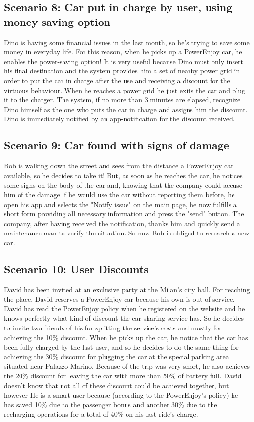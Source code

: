 \documentclass[10pt, a4paper,titlepage]{article}
\begin{document}
\subsection{Scenario 8: Car put in charge by user, using money saving option}
Dino is having some financial issues in the last month, so he's trying to save some money in everyday life.
For this reason, when he picks up a PowerEnjoy car, he enables the power-saving option! It is very useful because Dino must only insert his final destination and the system provides him a set of nearby power grid in order to put the car in charge after the use and receiving a discount for the virtuous behaviour.
When he reaches a power grid he just exits the car and plug it to the charger. The system, if no more than 3 minutes are elapsed, recognize Dino himself as the one who puts the car in charge and assigns him the discount. Dino is immediately notified by an app-notification for the discount received.
\subsection{Scenario 9: Car found with signs of damage}
Bob is walking down the street and sees from the distance a PowerEnjoy car available, so he decides to take it! But, as soon as he reaches the car, he notices some signs on the body of the car and, knowing that the company could accuse him of the damage if he would use the car without reporting them before, he open his app and selects the "Notify issue" on the main page, he now fulfills a short form providing all necessary information and press the "send" button. The company, after having received the notification, thanks him and quickly send a maintenance man to verify the situation. So now Bob is obliged to research a new car.
\subsection{Scenario 10: User Discounts}
David has been invited at an exclusive party at the Milan's city hall. For reaching the place, David reserves a PowerEnjoy car because his own is out of service. David has read the PowerEnjoy policy when he registered on the website and he knows perfectly what kind of discount the car sharing service has. So he decides to invite two friends of his for splitting the service's costs and mostly for achieving the 10\% discount. When he picks up the car, he notice that the car has been fully charged by the last user, and so he decides to do the same thing for achieving the 30\% discount for plugging the car at the special parking area situated near Palazzo Marino. 
Because of the trip was very short, he also achieves the 20\% discount for leaving the car with more than 50\% of battery full. 
David doesn't know that not all of these discount could be achieved together, but however He is a smart user because (according to the PowerEnjoy's policy) he has saved 10\% due to the passenger bonus and another 30\% due to the recharging operations for a total of 40\% on his last ride's charge.
\end{document}
